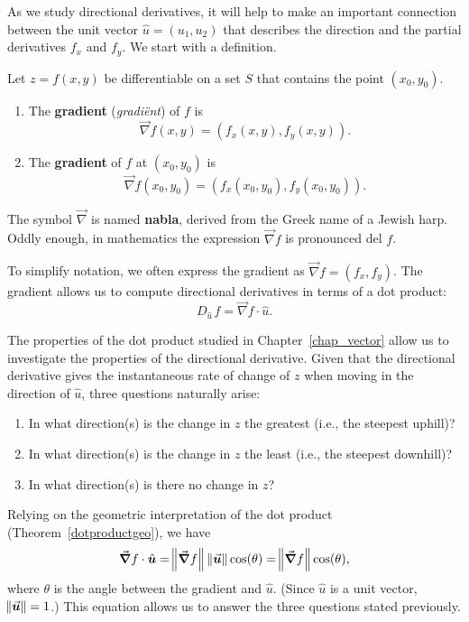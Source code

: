 As we study directional derivatives, it will help to make an important connection between the unit vector $\hat u = \left( u_1,u_2\right)$ that describes the direction and the partial derivatives $f_x$ and $f_y$. We start with a definition.

\begin{definition}[Gradient]\label{def:gradient}
Let $z=f(x,y)$ be differentiable on a set $S$ that contains the point $(x_0,y_0)$.
 
\begin{enumerate}
	\item The \textbf{gradient} (\textit{gradi\"ent}) of $f$ is $$\vec{\nabla} f(x,y) = \left( f_x(x,y),f_y(x,y)\right).$$
	\item The \textbf{gradient}  of $f$ at $(x_0,y_0)$ is $$\vec{\nabla} f(x_0,y_0) = \left( f_x(x_0,y_0),f_y(x_0,y_0)\right).$$
\end{enumerate}
\end{definition}

The symbol $\vec{\nabla}$ is named \textbf{nabla}, derived from the Greek name of a Jewish harp. Oddly enough, in mathematics the expression $\vec{\nabla} f$ is pronounced del $f$.

To simplify notation, we often express the gradient as $\vec{\nabla} f = \left( f_x, f_y\right)$. The gradient allows us to compute directional derivatives in terms of a dot product:
\begin{equation}
D_{\hat u\,}f = \vec{\nabla} f\cdot \hat u.
\label{idea:gradient_direct}
\end{equation}

The properties of the dot product studied in Chapter~\ref{chap_vector} allow us to investigate the properties of the directional derivative. Given that the directional derivative gives the instantaneous rate of change of $z$ when moving in the direction of $\hat u$, three questions naturally arise:
\begin{enumerate}
	\item In what direction(s) is the change in $z$ the greatest (i.e., the steepest uphill)?
	\item In what direction(s) is the change in $z$ the least (i.e.,  the steepest downhill)?
	\item In what direction(s) is there no change in $z$?
\end{enumerate}

Relying on the geometric interpretation of the dot product (Theorem~\ref{dotproductgeo}), we have
\begin{equation}\vec{\nabla} f\cdot \hat u = \norm{\vec{\nabla} f}\,\vnorm u \cos(\theta) = \norm{\vec{\nabla} f}\cos(\theta), \label{eq:gradient}\end{equation}
where $\theta$ is the angle between the gradient and $\hat u$. (Since $\hat u$ is a unit vector, $\vnorm{u} = 1$.) This equation allows us to answer the three questions stated previously.

